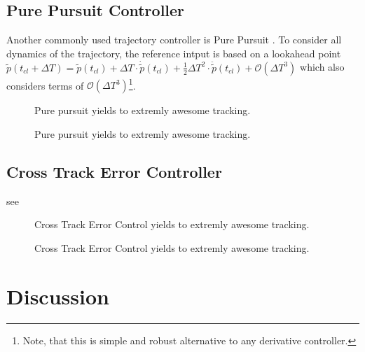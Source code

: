 \subsection{Pure Pursuit Controller}
Another commonly used trajectory controller is Pure Pursuit \cite{snider}. To consider all dynamics of the trajectory, the reference intput is based on a lookahead point $\tilde{p}(t_{cl}+\Delta T) = \tilde{p}(t_{cl}) + \Delta T \cdot \dot{\tilde{p}}(t_{cl}) + \frac{1}{2} \Delta T^2 \cdot \ddot{\tilde{p}}(t_{cl}) + \mathcal{O}(\Delta T^3)$ which also considers terms of $\mathcal{O}(\Delta T^3)$\footnote{Note, that this is simple and robust alternative to any derivative controller.}.

\begin{figure}[h]
    \centering
    \def\svgwidth{0.5\columnwidth}
    
    \caption{Pure pursuit yields to extremly awesome tracking.}
    \label{fig:scene_purePursuit}
\end{figure}

\begin{figure}[h]
    \centering
    \def\svgwidth{\columnwidth}
    
    \caption{Pure pursuit yields to extremly awesome tracking.}
    \label{fig:purePursuit}
\end{figure}

\subsection{Cross Track Error Controller}
see \cite{williams}

\begin{figure}[h]
    \centering
    \def\svgwidth{0.5\columnwidth}
    
    \caption{Cross Track Error Control yields to extremly awesome tracking.}
    \label{fig:scene_crossTrack}
\end{figure}


\begin{figure}[h]
    \centering
    \def\svgwidth{\columnwidth}
    
    \caption{Cross Track Error Control yields to extremly awesome tracking.}
    \label{fig:crossTrack}
\end{figure}

\section{Discussion}
\label{sec:discussion}

